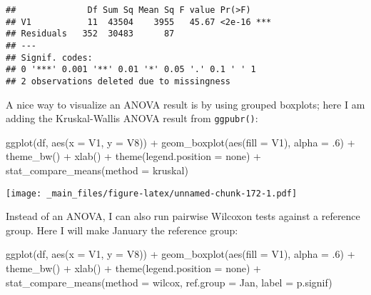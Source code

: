 \documentclass[
]{book}
\newenvironment{Shaded}{\begin{snugshade}}{\end{snugshade}}
\newcommand{\AttributeTok}[1]{\textcolor[rgb]{0.77,0.63,0.00}{#1}}
\newcommand{\DecValTok}[1]{\textcolor[rgb]{0.00,0.00,0.81}{#1}}
\newcommand{\FunctionTok}[1]{\textcolor[rgb]{0.00,0.00,0.00}{#1}}
\newcommand{\NormalTok}[1]{#1}
\newcommand{\SpecialCharTok}[1]{\textcolor[rgb]{0.00,0.00,0.00}{#1}}
\newcommand{\StringTok}[1]{\textcolor[rgb]{0.31,0.60,0.02}{#1}}
\begin{document}
\begin{verbatim}
##              Df Sum Sq Mean Sq F value Pr(>F)    
## V1           11  43504    3955   45.67 <2e-16 ***
## Residuals   352  30483      87                   
## ---
## Signif. codes:  
## 0 '***' 0.001 '**' 0.01 '*' 0.05 '.' 0.1 ' ' 1
## 2 observations deleted due to missingness
\end{verbatim}

A nice way to visualize an ANOVA result is by using grouped boxplots; here I am adding the Kruskal-Wallis ANOVA result from \texttt{ggpubr()}:

\begin{Shaded}
\begin{Highlighting}[]
\FunctionTok{ggplot}\NormalTok{(df, }\FunctionTok{aes}\NormalTok{(}\AttributeTok{x =}\NormalTok{ V1, }\AttributeTok{y =}\NormalTok{ V8)) }\SpecialCharTok{+}
  \FunctionTok{geom\_boxplot}\NormalTok{(}\FunctionTok{aes}\NormalTok{(}\AttributeTok{fill =}\NormalTok{ V1), }\AttributeTok{alpha =}\NormalTok{ .}\DecValTok{6}\NormalTok{) }\SpecialCharTok{+}
  \FunctionTok{theme\_bw}\NormalTok{() }\SpecialCharTok{+} \FunctionTok{xlab}\NormalTok{(}\StringTok{\textquotesingle{}\textquotesingle{}}\NormalTok{) }\SpecialCharTok{+}
  \FunctionTok{theme}\NormalTok{(}\AttributeTok{legend.position =} \StringTok{\textquotesingle{}none\textquotesingle{}}\NormalTok{) }\SpecialCharTok{+}
  \FunctionTok{stat\_compare\_means}\NormalTok{(}\AttributeTok{method =} \StringTok{\textquotesingle{}kruskal\textquotesingle{}}\NormalTok{)}
\end{Highlighting}
\end{Shaded}

\texttt{[image: \_main\_files/figure-latex/unnamed-chunk-172-1.pdf]}

Instead of an ANOVA, I can also run pairwise Wilcoxon tests against a reference group. Here I will make January the reference group:

\begin{Shaded}
\begin{Highlighting}[]
\FunctionTok{ggplot}\NormalTok{(df, }\FunctionTok{aes}\NormalTok{(}\AttributeTok{x =}\NormalTok{ V1, }\AttributeTok{y =}\NormalTok{ V8)) }\SpecialCharTok{+}
  \FunctionTok{geom\_boxplot}\NormalTok{(}\FunctionTok{aes}\NormalTok{(}\AttributeTok{fill =}\NormalTok{ V1), }\AttributeTok{alpha =}\NormalTok{ .}\DecValTok{6}\NormalTok{) }\SpecialCharTok{+}
  \FunctionTok{theme\_bw}\NormalTok{() }\SpecialCharTok{+} \FunctionTok{xlab}\NormalTok{(}\StringTok{\textquotesingle{}\textquotesingle{}}\NormalTok{) }\SpecialCharTok{+}
  \FunctionTok{theme}\NormalTok{(}\AttributeTok{legend.position =} \StringTok{\textquotesingle{}none\textquotesingle{}}\NormalTok{) }\SpecialCharTok{+}
  \FunctionTok{stat\_compare\_means}\NormalTok{(}\AttributeTok{method =} \StringTok{\textquotesingle{}wilcox\textquotesingle{}}\NormalTok{,}
                     \AttributeTok{ref.group =} \StringTok{\textquotesingle{}Jan\textquotesingle{}}\NormalTok{,}
                     \AttributeTok{label =} \StringTok{\textquotesingle{}p.signif\textquotesingle{}}\NormalTok{)}
\end{Highlighting}
\end{Shaded}
\end{document}
